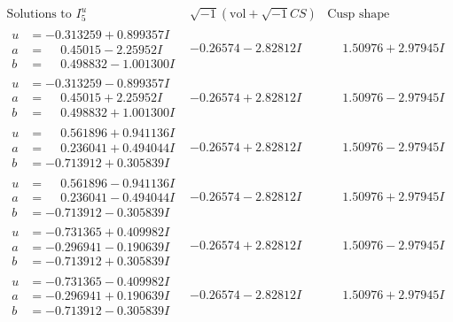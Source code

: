 \documentclass[1p]{elsarticle_modified}
\theoremstyle{definition}
\newcommand{\I}{\sqrt{-1}}
\begin{document}
$$\begin{array}{c|c|c}  
\text{Solutions to }I^u_{5}& \I (\text{vol} + \sqrt{-1}CS) & \text{Cusp shape}\\
 \hline 
\begin{aligned}
u &= -0.313259 + 0.899357 I \\
a &= \phantom{-}0.45015 - 2.25952 I \\
b &= \phantom{-}0.498832 - 1.001300 I\end{aligned}
 & -0.26574 - 2.82812 I & \phantom{-}1.50976 + 2.97945 I \\ \hline\begin{aligned}
u &= -0.313259 - 0.899357 I \\
a &= \phantom{-}0.45015 + 2.25952 I \\
b &= \phantom{-}0.498832 + 1.001300 I\end{aligned}
 & -0.26574 + 2.82812 I & \phantom{-}1.50976 - 2.97945 I \\ \hline\begin{aligned}
u &= \phantom{-}0.561896 + 0.941136 I \\
a &= \phantom{-}0.236041 + 0.494044 I \\
b &= -0.713912 + 0.305839 I\end{aligned}
 & -0.26574 + 2.82812 I & \phantom{-}1.50976 - 2.97945 I \\ \hline\begin{aligned}
u &= \phantom{-}0.561896 - 0.941136 I \\
a &= \phantom{-}0.236041 - 0.494044 I \\
b &= -0.713912 - 0.305839 I\end{aligned}
 & -0.26574 - 2.82812 I & \phantom{-}1.50976 + 2.97945 I \\ \hline\begin{aligned}
u &= -0.731365 + 0.409982 I \\
a &= -0.296941 - 0.190639 I \\
b &= -0.713912 + 0.305839 I\end{aligned}
 & -0.26574 + 2.82812 I & \phantom{-}1.50976 - 2.97945 I \\ \hline\begin{aligned}
u &= -0.731365 - 0.409982 I \\
a &= -0.296941 + 0.190639 I \\
b &= -0.713912 - 0.305839 I\end{aligned}
 & -0.26574 - 2.82812 I & \phantom{-}1.50976 + 2.97945 I \\ \hline\begin{aligned}

\end{aligned}
\end{array}$$
\end{document}
